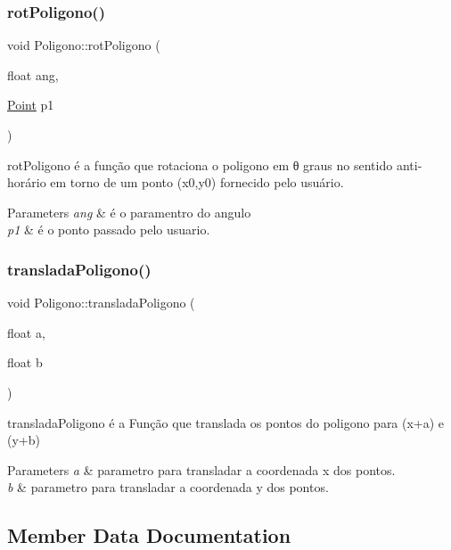 \subsubsection{\texorpdfstring{rot\+Poligono()}{rotPoligono()}}
{\footnotesize\ttfamily void Poligono\+::rot\+Poligono (\begin{DoxyParamCaption}\item[{float}]{ang,  }\item[{\mbox{\hyperlink{class_point}{Point}}}]{p1 }\end{DoxyParamCaption})}



rot\+Poligono é a função que rotaciona o poligono em θ graus no sentido anti-\/horário em torno de um ponto (x0,y0) fornecido pelo usuário. 


\begin{DoxyParams}{Parameters}
{\em ang} & é o paramentro do angulo \\
\hline
{\em p1} & é o ponto passado pelo usuario. \\
\hline
\end{DoxyParams}
\mbox{\label{class_poligono_a4d757f52ba9366ab13537fb19b363e1e}} 
\subsubsection{\texorpdfstring{translada\+Poligono()}{transladaPoligono()}}
{\footnotesize\ttfamily void Poligono\+::translada\+Poligono (\begin{DoxyParamCaption}\item[{float}]{a,  }\item[{float}]{b }\end{DoxyParamCaption})}



translada\+Poligono é a Função que translada os pontos do poligono para (x+a) e (y+b) 


\begin{DoxyParams}{Parameters}
{\em a} & parametro para transladar a coordenada x dos pontos. \\
\hline
{\em b} & parametro para transladar a coordenada y dos pontos. \\
\hline
\end{DoxyParams}


\subsection{Member Data Documentation}
\mbox{\label{class_poligono_a9ee4bec594127166d10a527298addc53}} 
